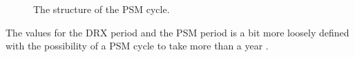 \begin{figure}[H]
\centering
\resizebox{\textwidth}{!}{
}
\caption{The structure of the \gls{PSM} cycle.}
\label{fig:PSM_structure}
\end{figure}

The values for the DRX period and the PSM period is a bit more loosely defined with the possibility of a PSM cycle to take more than a year \citep{NB-IoT_Book}.





